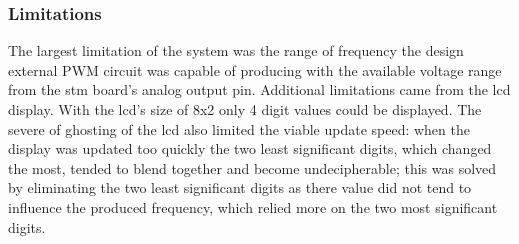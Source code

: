 \subsubsection{Limitations}
The largest limitation of the system was the range of frequency the
design external PWM circuit was capable of producing with the available
voltage range from the \gls{stm} board's analog output pin. Additional
limitations came from the \gls{lcd} display. With the \gls{lcd}'s size
of 8x2 only 4 digit values could be displayed. The severe of
ghosting of the \gls{lcd} also limited the viable update speed: when the
display was updated too quickly the two least significant digits, which
changed the most, tended to blend together and become undecipherable;
this was solved by eliminating the two least significant digits as there
value did not tend to influence the produced frequency, which relied
more on the two most significant digits.
